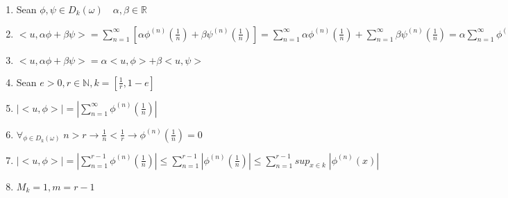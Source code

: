 \begin{enumerate}
  \item Sean $\phi, \psi \in D_k(\omega) \quad \alpha,\beta \in \mathbb{R}$
  \item $<u, \alpha \phi + \beta \psi> = \sum_{n=1}^\infty \left[ \alpha \phi^{(n)}(\frac{1}{n}) + \beta \psi^{(n)} (\frac{1}{n}) \right] = \sum_{n=1}^\infty \alpha \phi^{(n)}(\frac{1}{n}) + \sum_{n=1}^\infty \beta \psi^{(n)} (\frac{1}{n}) = \alpha \sum_{n=1}^\infty \phi^{(n)}(\frac{1}{n}) + \beta \sum_{n=1}^\infty \psi^{(n)} (\frac{1}{n})$
  \item $<u, \alpha \phi + \beta \psi> = \alpha <u, \phi> + \beta <u, \psi>$
  \item Sean $e>0, r \in \mathbb{N}, k = [\frac{1}{r}, 1-e]$
  \item $|<u,\phi>| = |\sum_{n=1}^\infty \phi^{(n)} (\frac{1}{n})| $
  \item $\forall_{\phi \in D_k(\omega)} \; n > r \to \frac{1}{n} < \frac{1}{r} \to \phi^{(n)} (\frac{1}{n}) = 0$
  \item $|<u, \phi>| = |\sum_{n=1}^{r-1} \phi^{(n)} (\frac{1}{n})| \leq \sum_{n=1}^{r-1} |\phi^{(n)} (\frac{1}{n})| \leq \sum_{n=1}^{r-1} sup_{x \in k} \; |\phi^{(n)} (x)|$
  \item $M_k = 1, m=r-1$
\end{enumerate}

